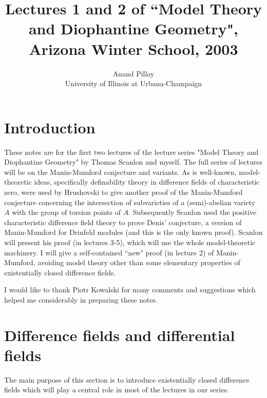 \title{Lectures 1 and 2 of ``Model Theory and
Diophantine Geometry", Arizona Winter School,
2003}
\author{Anand Pillay\\University of Illinois
at Urbana-Champaign}
\newtheorem{Theorem}{Theorem}[section]
\newtheorem{Proposition}[Theorem]{Proposition}
\newtheorem{Definition}[Theorem]{Definition}
\newtheorem{Remark}[Theorem]{Remark}
\newtheorem{Lemma}[Theorem]{Lemma}
\newtheorem{Corollary}[Theorem]{Corollary}
\newtheorem{Fact}[Theorem]{Fact}
\newtheorem{Conjecture}[Theorem]{Conjecture}

\maketitle

\section{Introduction}
These notes are for the first two lectures of
the lecture series "Model Theory and
Diophantine Geometry" by Thomas Scanlon and
myself. The full series of lectures will be on
the Manin-Mumford conjecture and variants.
As is well-known, model-theoretic ideas,
specifically definability theory in difference
fields of characteristic zero, were used by
Hrushovski \cite{Hrushovski-MM} to give another
proof of the Manin-Mumford conjecture
concerning the intersection of  subvarieties
of a (semi)-abelian variety $A$ with the group
of torsion points of $A$. Subsequently Scanlon
\cite{Scanlon} used the positive characteristic
difference field theory to prove Denis'
conjecture, a version of Manin-Mumford for
Drinfeld modules (and this is the only known
proof). Scanlon will present his proof (in
lectures 3-5), which will use the whole
model-theoretic machinery. I will give a
self-contained ``new" proof (in lecture 2) of
Manin-Mumford, avoiding model theory other
than some elementary properties of
existentially closed difference fields.


I would like to thank Piotr Kowalski for many
comments and suggestions which helped me
considerably in preparing these notes.


\section{Difference fields and differential
fields}
The main purpose of this section is to
introduce existentially closed difference
fields which will play a central role in most
of the lectures in our series.

